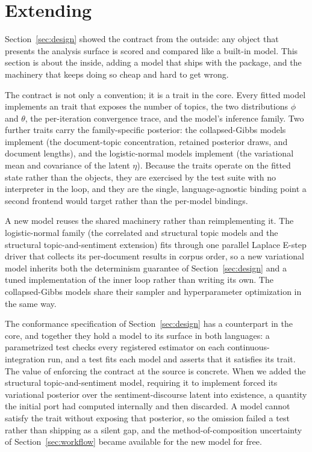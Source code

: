 \documentclass[article,nojss]{jss}
\begin{document}
\section[Extending topica]{Extending }\label{sec:extending}

Section~\ref{sec:design} showed the contract from the outside: any object that
presents the analysis surface is scored and compared like a built-in model. This
section is about the inside, adding a model that ships with the package, and the
machinery that keeps doing so cheap and hard to get wrong.

The contract is not only a  convention; it is a trait in the
 core. Every fitted model implements an  trait
that exposes the number of topics, the two distributions $\phi$ and $\theta$, the
per-iteration convergence trace, and the model's inference family. Two further
traits carry the family-specific posterior: the collapsed-Gibbs models implement
 (the document-topic concentration, retained posterior
draws, and document lengths), and the logistic-normal models implement
 (the variational mean and covariance of the latent
$\eta$). Because the traits operate on the fitted state rather than the
 objects, they are exercised by the  test suite
with no interpreter in the loop, and they are the single, language-agnostic
binding point a second frontend would target rather than the per-model
 bindings.

A new model reuses the shared machinery rather than reimplementing it. The
logistic-normal family (the correlated and structural topic models and the
structural topic-and-sentiment extension) fits through one parallel Laplace
E-step driver that collects its per-document results in corpus order, so a new
variational model inherits both the determinism guarantee of
Section~\ref{sec:design} and a tuned implementation of the inner loop rather than
writing its own. The collapsed-Gibbs models share their sampler and
hyperparameter optimization in the same way.

The conformance specification of Section~\ref{sec:design} has a counterpart in the
core, and together they hold a model to its surface in both languages: a
parametrized  test checks every registered estimator on each
continuous-integration run, and a  test fits each model and asserts
that it satisfies its trait. The value of enforcing the contract at the source is
concrete. When we added the structural topic-and-sentiment model, requiring it to
implement  forced its variational posterior over the
sentiment-discourse latent into existence, a quantity the initial port had
computed internally and then discarded. A model cannot satisfy the trait without
exposing that posterior, so the omission failed a test rather than shipping as a
silent gap, and the method-of-composition uncertainty of
Section~\ref{sec:workflow} became available for the new model for free.
\end{document}
